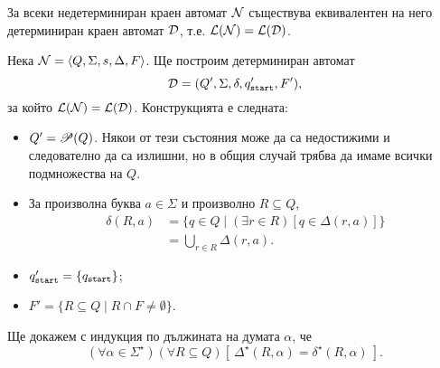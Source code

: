 \begin{framed}
\begin{thm}
  За всеки недетерминиран краен автомат $\mathcal{N}$ съществува еквивалентен на него детерминиран краен автомат $\mathcal{D}$, т.е. $\mathcal{L}(\mathcal{N}) = \mathcal{L}(\mathcal{D})$.
\end{thm}
\end{framed}
\begin{hint}
  Нека $\mathcal{N} = \langle{Q,\Sigma,s,\Delta,F}\rangle$. Ще построим детерминиран автомат
  \[\mathcal{D} = (Q',\Sigma,\delta,q_{\texttt{start}}',F'),\]
  за който $\mathcal{L}(\mathcal{N}) = \mathcal{L}(\mathcal{D})$.
  Конструкцията е следната:
  \begin{itemize}
  \item
    $Q' = \mathscr{P}(Q)$. Някои от тези състояния може да са недостижими и следователно да са излишни, но в общия случай трябва да имаме
    всички подмножества на $Q$.
  \item
    За произволна буква $a\in\Sigma$ и произволно $R \subseteq Q$,
    \begin{align*}
      \delta(R,a) & = \{q\in Q\mid (\exists r\in R)[q\in\Delta(r,a)]\}\\
                  & = \bigcup_{r\in R}\Delta(r,a).
    \end{align*}
  \item
    $q_{\texttt{start}}' = \{q_{\texttt{start}}\}$;
  \item
    $F' = \{R \subseteq Q \mid R\cap F \neq \emptyset\}$.
  \end{itemize}
  Ще докажем с индукция по дължината на думата $\alpha$, че
  \begin{equation}
    \label{eq:6}
    (\forall \alpha\in\Sigma^\star)(\forall R \subseteq Q)[\ \Delta^\star(R,\alpha) = \delta^\star(R,\alpha)\ ].
  \end{equation}


\end{hint}
